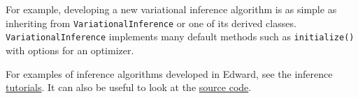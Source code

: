 For example, developing a new variational inference algorithm is as simple as
inheriting from \texttt{VariationalInference} or one of its derived
classes. \texttt{VariationalInference} implements many default methods such
as \texttt{initialize()} with options for an optimizer.

For examples of inference algorithms developed in Edward, see the inference
\href{/tutorials/}{tutorials}. It can also be useful to look at
the
\href{https://github.com/blei-lab/edward/tree/master/edward/inferences}
{source code}.
